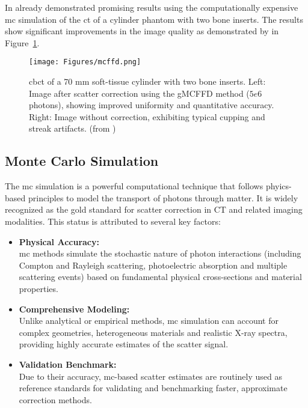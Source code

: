 In \citeyear{mcffd2011} \citeauthor{mcffd2011} \cite{mcffd2011} already
demonstrated promising results using the computationally expensive \ac{mc}
simulation of the \ac{ct} of a cylinder phantom with two bone inserts. The
results show significant improvements in the image quality as demonstrated by
\citeauthor{mcffd2011} in Figure~\ref{fig:scatter_correction_comparison}.

\captionsetup{justification=justified,singlelinecheck=false}
\begin{figure}[!h]
    \centering
    \texttt{[image: Figures/mcffd.png]}
    \caption{\ac{cbct} of a 70 mm soft-tissue cylinder with two bone inserts.
    Left: Image after scatter correction using the gMCFFD method ($5e6$
    photons), showing improved uniformity and quantitative accuracy. Right:
    Image without correction, exhibiting typical cupping and streak artifacts.
    (from \cite{mcffd2011})}
    \label{fig:scatter_correction_comparison}
\end{figure}

\subsection{Monte Carlo Simulation}

The \ac{mc} simulation is a powerful computational technique that follows
phyics-based principles to model the transport of photons through matter. It is
widely recognized as the gold standard for scatter correction in CT and related
imaging modalities. This status is attributed to several key factors:

\begin{itemize}
    \item \textbf{Physical Accuracy:} \\
    \ac{mc} methods simulate the stochastic nature of photon interactions
    (including Compton and Rayleigh scattering, photoelectric absorption and
    multiple scattering events) based on fundamental physical cross-sections and
    material properties.

    \item \textbf{Comprehensive Modeling:} \\
    Unlike analytical or empirical methods, \ac{mc} simulation can account for
    complex geometries, heterogeneous materials and realistic X-ray spectra,
    providing highly accurate estimates of the scatter signal.

    \item \textbf{Validation Benchmark:} \\
    Due to their accuracy, \ac{mc}-based scatter estimates are routinely used as
    reference standards for validating and benchmarking faster, approximate
    correction methods.
\end{itemize}



